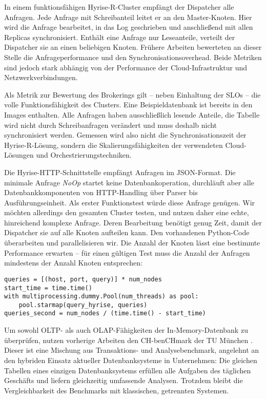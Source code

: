 
In einem funktionsfähigen Hyrise-R-Cluster empfängt der Dispatcher alle Anfragen. Jede Anfrage mit Schreibanteil leitet er an den Master-Knoten. Hier wird die Anfrage bearbeitet, in das Log geschrieben und anschließend mit allen Replicas synchronisiert. Enthält eine Anfrage nur Leseanteile, verteilt der Dispatcher sie an einen beliebigen Knoten. Frühere Arbeiten bewerteten an dieser Stelle die Anfrageperformance und den Synchronisationsoverhead. Beide Metriken sind jedoch stark abhängig von der Performance der Cloud-Infrastruktur und Netzwerkverbindungen.

Als Metrik zur Bewertung des Brokerings gilt -- neben Einhaltung der SLOs -- die volle Funktionsfähigkeit des Clusters. Eine Beispieldatenbank ist bereits in den Images enthalten. Alle Anfragen haben ausschließlich lesende Anteile, die Tabelle wird nicht durch Schreibanfragen verändert und muss deshalb nicht synchronisiert werden. Gemessen wird also nicht die Synchronisationszeit der Hyrise-R-Lösung, sondern die Skalierungsfähigkeiten der verwendeten Cloud-Lösungen und Orchestrierungstechniken.

Die Hyrise-HTTP-Schnittstelle empfängt Anfragen im JSON-Format. Die minimale Anfrage \emph{NoOp} startet keine Datenbankoperation, durchläuft aber alle Datenbankkomponenten von HTTP-Handling über Parser bis Ausführungseinheit. Als erster Funktionstest würde diese Anfrage genügen. Wir möchten allerdings den gesamten Cluster testen, und nutzen daher eine echte, hinreichend komplexe Anfrage. Deren Bearbeitung benötigt genug Zeit, damit der Dispatcher sie auf alle Knoten aufteilen kann. Den vorhandenen Python-Code überarbeiten und parallelisieren wir. Die Anzahl der Knoten lässt eine bestimmte Performance erwarten -- für einen gültigen Test muss die Anzahl der Anfragen mindestens der Anzahl Knoten entsprechen:

\begin{verbatim}
queries = [(host, port, query)] * num_nodes
start_time = time.time()
with multiprocessing.dummy.Pool(num_threads) as pool:
	pool.starmap(query_hyrise, queries)
queries_second = num_nodes / (time.time() - start_time)
\end{verbatim}

Um sowohl OLTP- als auch OLAP-Fähigkeiten der In-Memory-Datenbank zu überprüfen, nutzen vorherige Arbeiten \cite{ssiclops:d42:experiments-measurements} den CH-benCHmark der TU München \cite{cole:2011:db-benchmark}. Dieser ist eine Mischung aus Transaktions- und Analysebenchmark, angelehnt an den hybriden Einsatz aktueller Datenbanksysteme in Unternehmen: Die gleichen Tabellen eines einzigen Datenbanksystems erfüllen alle Aufgaben des täglichen Geschäfts und liefern gleichzeitig umfassende Analysen. Trotzdem bleibt die Vergleichbarkeit des Benchmarks mit klassischen, getrennten Systemen.

